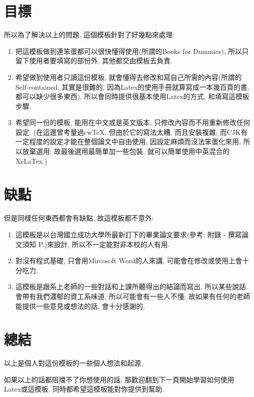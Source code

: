 
\section{目標}
所以為了解決以上的問題, 這個模板針對了好幾點來處理:

\begin{enumerate}

  \item 把這模板做到連笨蛋都可以很快懂得使用(所謂的Books for Dummies), 所以只留下使用者要填寫的部份外, 其他都交由模板去負責.

  \item 希望做到使用者只讀這份模板, 就會懂得去修改和寫自己所需的內容(所謂的Self-contained. 其實是很難的, 因為Latex的使用手冊就算寫成一本幾百頁的書, 都可以缺少很多東西), 所以會同時提供很基本使用Latex的方式, 和填寫這模板步驟.

  \item 希望同一份的模板, 能用在中文或是英文版本, 只修改內容而不用重新修改任何設定. (在這邊曾考量過cwTeX, 但由於它的寫法太糟, 而且安裝複雜\cite{web:latex:cwtex}; 而CJK有一定程度的設定才能在整個論文中自由使用, 因設定麻煩而沒法笨蛋化來用, 所以放棄選用; 故最後選用最簡單加一些包裝, 就可以簡單使用中英混合的XeLaTex.)

\end{enumerate}


\section{缺點}
但是同樣任何東西都會有缺點, 故這模板都不意外:

\begin{enumerate}

  \item 這模板是以台灣國立成功大學所最新訂下的畢業論文要求(參考: 附錄 - 撰寫論文須知 P.\pageref{appendix:thesis-spec})來設計, 所以不一定能對非本校的人有用.

  \item 對沒有程式基礎, 只會用Mircosoft Word的人來講, 可能會在修改或使用上會十分吃力.

  \item 這模板是跟系上老師的一些對話和上課所聽得出的結論而寫出, 所以某些說話會帶有我們濃郁的資工系味道, 所以可能會有一些人不懂; 故如果有任何的老師能提供一些意見或想法的話, 會十分感謝的.

\end{enumerate}


\section{總結}

以上是個人對這份模板的一些個人想法和起源.

如果以上的話都阻擋不了你想使用的話, 那歡迎翻到下一頁開始學習如何使用Latex或這模板, 同時都希望這模板能對你提供到幫助.

\EndChapter

